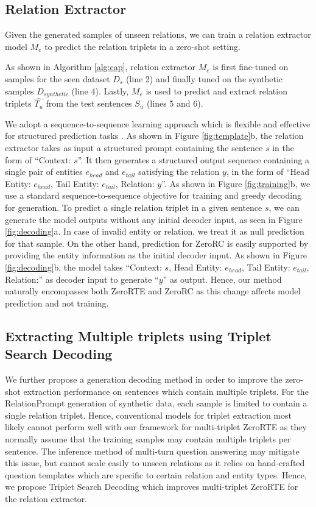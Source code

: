 \documentclass[11pt]{article}
\newcommand{\flag}[1]{#1}
\begin{document}
\subsection{Relation Extractor}
Given the generated samples of unseen relations, we can train a relation extractor model $M_{e}$ to predict the relation triplets in a zero-shot setting.
\flag{
As shown in Algorithm \ref{alg:cap}, relation extractor $M_e$ is first fine-tuned on samples for the seen dataset $D_{s}$ (line 2) and finally tuned on the synthetic samples $D_{synthetic}$ (line 4).
Lastly, $M_e$ is used to predict and extract relation triplets $\hat{T_u}$ from the test sentences $S_u$ (lines 5 and 6).
}
We adopt a sequence-to-sequence learning approach which is flexible and effective for structured prediction tasks \cite{cui2021template, paolini2020structured}.
As shown in Figure \ref{fig:template}b, the relation extractor takes as input a structured prompt containing the sentence $s$ in the form of ``Context: $s$''. 
It then generates a structured output sequence containing a single pair of entities $e_{head}$ and $e_{tail}$ satisfying the relation $y$, in the form of ``Head Entity: $e_{head}$, Tail Entity: $e_{tail}$, Relation: $y$''.
As shown in Figure \ref{fig:training}b, we use a standard sequence-to-sequence objective \cite{lewis2020bart} for training and greedy decoding for generation.
To predict a single relation triplet in a given sentence $s$, we can generate the model outputs without any initial decoder input, as seen in Figure \ref{fig:decoding}a. 
In case of invalid entity or relation, we treat it as null prediction for that sample.
On the other hand, prediction for ZeroRC is easily supported by providing the entity information as the initial decoder input.
As shown in Figure \ref{fig:decoding}b, the model takes ``Context: $s$, Head Entity: $e_{head}$, Tail Entity: $e_{tail}$, Relation:'' as decoder input to generate ``$y$'' as output.
Hence, our method naturally encompasses both ZeroRTE and ZeroRC as this change affects model prediction and not training.
 



\subsection{Extracting Multiple triplets using Triplet Search Decoding}
We further propose a generation decoding method in order to improve the zero-shot extraction performance on sentences which contain multiple triplets.
For the RelationPrompt generation of synthetic data, each sample is limited to contain a single relation triplet.
Hence, conventional models for triplet extraction most likely cannot perform well with our framework for multi-triplet ZeroRTE as they normally assume that the training samples may contain multiple triplets per sentence.
The inference method of multi-turn question answering \cite{li2019entity} may mitigate this issue, but cannot scale easily to unseen relations as it relies on hand-crafted question templates which are specific to certain relation and entity types.
Hence, we propose Triplet Search Decoding which improves multi-triplet ZeroRTE for the relation extractor.
\end{document}
